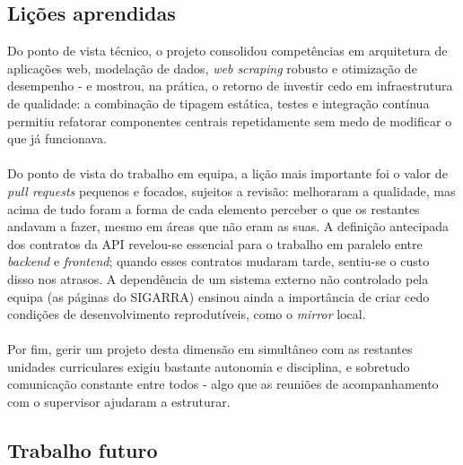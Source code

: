 \documentclass[10pt]{article}
\begin{document}
\subsection{Lições aprendidas}

    Do ponto de vista técnico, o projeto consolidou competências em arquitetura de aplicações web, modelação de dados, \emph{web scraping} robusto e otimização de desempenho - e mostrou, na prática, o retorno de investir cedo em infraestrutura de qualidade: a combinação de tipagem estática, testes e integração contínua permitiu refatorar componentes centrais repetidamente sem medo de modificar o que já funcionava.
    \\\\
    Do ponto de vista do trabalho em equipa, a lição mais importante foi o valor de \emph{pull requests} pequenos e focados, sujeitos a revisão: melhoraram a qualidade, mas acima de tudo foram a forma de cada elemento perceber o que os restantes andavam a fazer, mesmo em áreas que não eram as suas. A definição antecipada dos contratos da API revelou-se essencial para o trabalho em paralelo entre \emph{backend} e \emph{frontend}; quando esses contratos mudaram tarde, sentiu-se o custo disso nos atrasos.
    A dependência de um sistema externo não controlado pela equipa (as páginas do SIGARRA) ensinou ainda a importância de criar cedo condições de desenvolvimento reprodutíveis, como o \emph{mirror} local.
    \\\\
    Por fim, gerir um projeto desta dimensão em simultâneo com as restantes unidades curriculares exigiu bastante autonomia e disciplina, e sobretudo comunicação constante entre todos - algo que as reuniões de acompanhamento com o supervisor ajudaram a estruturar.
	
\subsection{Trabalho futuro} 
 
\end{document}
